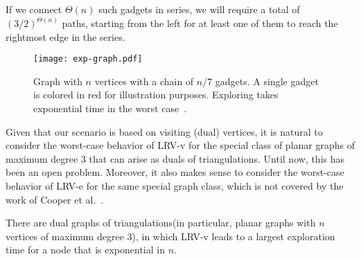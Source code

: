 If we connect
$\Theta(n)$ such gadgets in series, we will require a total of
$(3/2)^{\Theta(n)}$ paths,
starting from the left for at least one of them to reach the rightmost edge in the series.
\begin{figure}
\centering
\texttt{[image: exp-graph.pdf]}
\caption{Graph with $n$ vertices with a chain of $n/7$
gadgets. A single gadget is colored in red for illustration purposes. Exploring takes exponential time in the worst case~\cite{cik+-drwug-11}.} \label{fig:reg_graph}
\vspace{-3mm}
\end{figure}
Given that our scenario is based on visiting (dual) vertices, it is natural
to consider the worst-case behavior of LRV-v for the special class
of planar graphs of maximum degree 3 that can arise as duals of triangulations.
Until now, this has been an open problem. Moreover, it also makes sense to
consider the worst-case behavior of LRV-e for the same special graph class,
which is not covered by the work of Cooper et al.~\cite{cik+-drwug-11}.

\begin{theorem}
\label{th:lb.LRV-v}
There are dual graphs of triangulations(in particular, planar graphs with $n$ vertices of maximum degree 3), in which LRV-v
leads to a largest exploration time for a node that is exponential in $n$.
\end{theorem}

